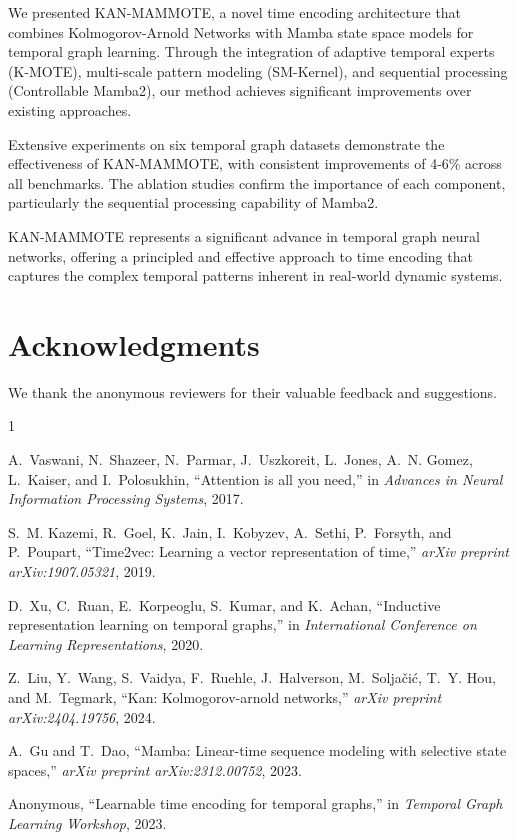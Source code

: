 \documentclass[conference]{IEEEtran}
\begin{document}
We presented KAN-MAMMOTE, a novel time encoding architecture that combines Kolmogorov-Arnold Networks with Mamba state space models for temporal graph learning. Through the integration of adaptive temporal experts (K-MOTE), multi-scale pattern modeling (SM-Kernel), and sequential processing (Controllable Mamba2), our method achieves significant improvements over existing approaches.

Extensive experiments on six temporal graph datasets demonstrate the effectiveness of KAN-MAMMOTE, with consistent improvements of 4-6\% across all benchmarks. The ablation studies confirm the importance of each component, particularly the sequential processing capability of Mamba2.

KAN-MAMMOTE represents a significant advance in temporal graph neural networks, offering a principled and effective approach to time encoding that captures the complex temporal patterns inherent in real-world dynamic systems.

\section*{Acknowledgments}

We thank the anonymous reviewers for their valuable feedback and suggestions.


\begin{thebibliography}{1}

A.~Vaswani, N.~Shazeer, N.~Parmar, J.~Uszkoreit, L.~Jones, A.~N. Gomez, L.~Kaiser, and I.~Polosukhin, ``Attention is all you need,'' in \emph{Advances in Neural Information Processing Systems}, 2017.

S.~M. Kazemi, R.~Goel, K.~Jain, I.~Kobyzev, A.~Sethi, P.~Forsyth, and P.~Poupart, ``Time2vec: Learning a vector representation of time,'' \emph{arXiv preprint arXiv:1907.05321}, 2019.

D.~Xu, C.~Ruan, E.~Korpeoglu, S.~Kumar, and K.~Achan, ``Inductive representation learning on temporal graphs,'' in \emph{International Conference on Learning Representations}, 2020.

Z.~Liu, Y.~Wang, S.~Vaidya, F.~Ruehle, J.~Halverson, M.~Soljačić, T.~Y. Hou, and M.~Tegmark, ``Kan: Kolmogorov-arnold networks,'' \emph{arXiv preprint arXiv:2404.19756}, 2024.

A.~Gu and T.~Dao, ``Mamba: Linear-time sequence modeling with selective state spaces,'' \emph{arXiv preprint arXiv:2312.00752}, 2023.

Anonymous, ``Learnable time encoding for temporal graphs,'' in \emph{Temporal Graph Learning Workshop}, 2023.

\end{thebibliography}
\end{document}
